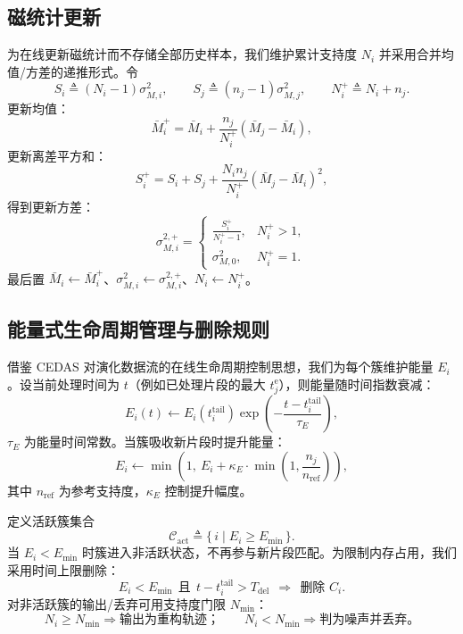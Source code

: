 \documentclass{xdupgthesis}
\begin{document}
\subsection{磁统计更新}
为在线更新磁统计而不存储全部历史样本，我们维护累计支持度 $N_i$ 并采用合并均值/方差的递推形式。令
\[
S_i\triangleq (N_i-1)\sigma_{M,i}^2,\qquad
S_j\triangleq (n_j-1)\sigma_{M,j}^2,\qquad
N_i^+\triangleq N_i+n_j.
\]
更新均值：
\begin{equation}
	\bar M_i^{+}
	=
	\bar M_i+\frac{n_j}{N_i^+}(\bar M_j-\bar M_i),
	\tag{4-30}
\end{equation}
更新离差平方和：
\begin{equation}
	S_i^{+}
	=
	S_i+S_j+\frac{N_i n_j}{N_i^+}(\bar M_j-\bar M_i)^2,
	\tag{4-31}
\end{equation}
得到更新方差：
\begin{equation}
	\sigma_{M,i}^{2,+}
	=
	\begin{cases}
		\displaystyle \frac{S_i^{+}}{N_i^{+}-1}, & N_i^{+}>1,\\[6pt]
		\sigma_{M,0}^2, & N_i^{+}=1.
	\end{cases}
	\tag{4-32}
\end{equation}
最后置 $\bar M_i\leftarrow\bar M_i^+$、$\sigma_{M,i}^2\leftarrow\sigma_{M,i}^{2,+}$、$N_i\leftarrow N_i^+$。

\subsection{能量式生命周期管理与删除规则}
\label{sec:lifecycle_zh}
借鉴 CEDAS 对演化数据流的在线生命周期控制思想，我们为每个簇维护能量 $E_i$。设当前处理时间为 $t$（例如已处理片段的最大 $t_j^{\mathrm{e}}$），则能量随时间指数衰减：
\begin{equation}
	E_i(t)\leftarrow E_i(t_i^{\mathrm{tail}})\exp\!\left(-\frac{t-t_i^{\mathrm{tail}}}{\tau_E}\right),
	\tag{4-33}
\end{equation}
$\tau_E$ 为能量时间常数。当簇吸收新片段时提升能量：
\begin{equation}
	E_i\leftarrow \min\!\left(1,\ E_i+\kappa_E\cdot \min\!\left(1,\frac{n_j}{n_{\mathrm{ref}}}\right)\right),
	\tag{4-34}
\end{equation}
其中 $n_{\mathrm{ref}}$ 为参考支持度，$\kappa_E$ 控制提升幅度。

定义活跃簇集合
\begin{equation}
	\mathcal{C}_{\mathrm{act}}\triangleq \{\,i\mid E_i\ge E_{\min}\,\}.
	\tag{4-35}
\end{equation}
当 $E_i<E_{\min}$ 时簇进入非活跃状态，不再参与新片段匹配。为限制内存占用，我们采用时间上限删除：
\begin{equation}
	E_i<E_{\min}\ \ \text{且}\ \ t-t_i^{\mathrm{tail}}>T_{\mathrm{del}}
	\ \ \Rightarrow\ \ \text{删除 } C_i.
	\tag{4-36}
\end{equation}
对非活跃簇的输出/丢弃可用支持度门限 $N_{\min}$：
\begin{equation}
	N_i\ge N_{\min}\Rightarrow \text{输出为重构轨迹；}\qquad
	N_i< N_{\min}\Rightarrow \text{判为噪声并丢弃。}
	\tag{4-37}
\end{equation}
\end{document}
